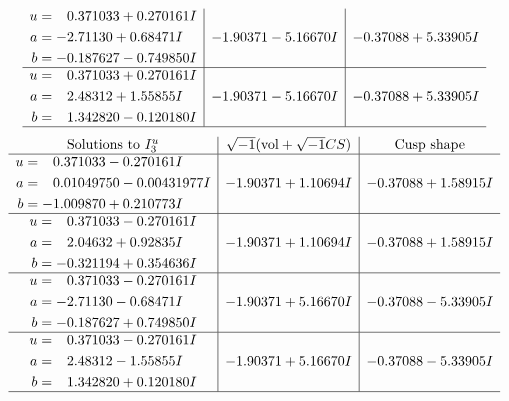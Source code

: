 \documentclass[1p]{elsarticle_modified}
\theoremstyle{definition}
\newcommand{\I}{\sqrt{-1}}
\begin{document}
$$\begin{array}{c|c|c}
\begin{aligned}
u &= \phantom{-}0.371033 + 0.270161 I \\
a &= -2.71130 + 0.68471 I \\
b &= -0.187627 - 0.749850 I\end{aligned}
 & -1.90371 - 5.16670 I & -0.37088 + 5.33905 I \\ \hline\begin{aligned}
u &= \phantom{-}0.371033 + 0.270161 I \\
a &= \phantom{-}2.48312 + 1.55855 I \\
b &= \phantom{-}1.342820 - 0.120180 I\end{aligned}
 & -1.90371 - 5.16670 I & -0.37088 + 5.33905 I\\
 \hline 
 \end{array}$$\newpage$$\begin{array}{c|c|c}  
\text{Solutions to }I^u_{3}& \I (\text{vol} + \sqrt{-1}CS) & \text{Cusp shape}\\
 \hline 
\begin{aligned}
u &= \phantom{-}0.371033 - 0.270161 I \\
a &= \phantom{-}0.01049750 - 0.00431977 I \\
b &= -1.009870 + 0.210773 I\end{aligned}
 & -1.90371 + 1.10694 I & -0.37088 + 1.58915 I \\ \hline\begin{aligned}
u &= \phantom{-}0.371033 - 0.270161 I \\
a &= \phantom{-}2.04632 + 0.92835 I \\
b &= -0.321194 + 0.354636 I\end{aligned}
 & -1.90371 + 1.10694 I & -0.37088 + 1.58915 I \\ \hline\begin{aligned}
u &= \phantom{-}0.371033 - 0.270161 I \\
a &= -2.71130 - 0.68471 I \\
b &= -0.187627 + 0.749850 I\end{aligned}
 & -1.90371 + 5.16670 I & -0.37088 - 5.33905 I \\ \hline\begin{aligned}
u &= \phantom{-}0.371033 - 0.270161 I \\
a &= \phantom{-}2.48312 - 1.55855 I \\
b &= \phantom{-}1.342820 + 0.120180 I\end{aligned}
 & -1.90371 + 5.16670 I & -0.37088 - 5.33905 I\\
 \hline 
 \end{array}$$\newpage\newpage\renewcommand{\arraystretch}{1}
\end{document}
